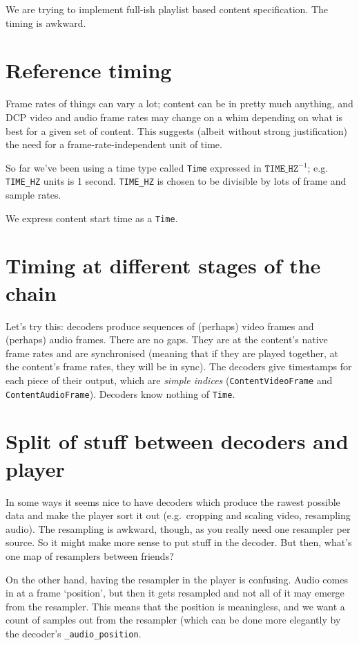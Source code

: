 \documentclass{article}
\begin{document}
We are trying to implement full-ish playlist based content specification.  The timing is awkward.

\section{Reference timing}

Frame rates of things can vary a lot; content can be in pretty much
anything, and DCP video and audio frame rates may change on a whim
depending on what is best for a given set of content.  This suggests
(albeit without strong justification) the need for a
frame-rate-independent unit of time.

So far we've been using a time type called \texttt{Time} expressed in
$\mathtt{TIME\_HZ}^{-1}$; e.g. \texttt{TIME\_HZ} units is 1 second.
\texttt{TIME\_HZ} is chosen to be divisible by lots of frame and
sample rates.

We express content start time as a \texttt{Time}.


\section{Timing at different stages of the chain}

Let's try this: decoders produce sequences of (perhaps) video frames
and (perhaps) audio frames.  There are no gaps.  They are at the
content's native frame rates and are synchronised (meaning that if
they are played together, at the content's frame rates, they will be
in sync).  The decoders give timestamps for each piece of their
output, which are \emph{simple indices} (\texttt{ContentVideoFrame}
and \texttt{ContentAudioFrame}).  Decoders know nothing of \texttt{Time}.


\section{Split of stuff between decoders and player}

In some ways it seems nice to have decoders which produce the rawest
possible data and make the player sort it out (e.g.\ cropping and
scaling video, resampling audio).  The resampling is awkward, though,
as you really need one resampler per source.  So it might make more sense
to put stuff in the decoder.  But then, what's one map of resamplers between friends?

On the other hand, having the resampler in the player is confusing.  Audio comes in
at a frame `position', but then it gets resampled and not all of it may emerge from
the resampler.  This means that the position is meaningless, and we want a count
of samples out from the resampler (which can be done more elegantly by the decoder's
\texttt{\_audio\_position}.
\end{document}
